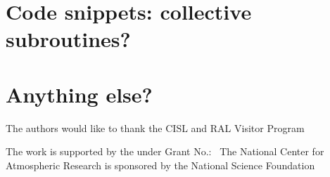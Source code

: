 


%




\appendix
\section{Code snippets: collective subroutines?}
\section{Anything else?}

\begin{acks}
  The authors would like to thank the CISL and RAL Visitor Program

  The work is
  supported by the  under Grant
  No.:~
  The National Center for Atmospheric Research is sponsored by the National Science Foundation

\end{acks}
